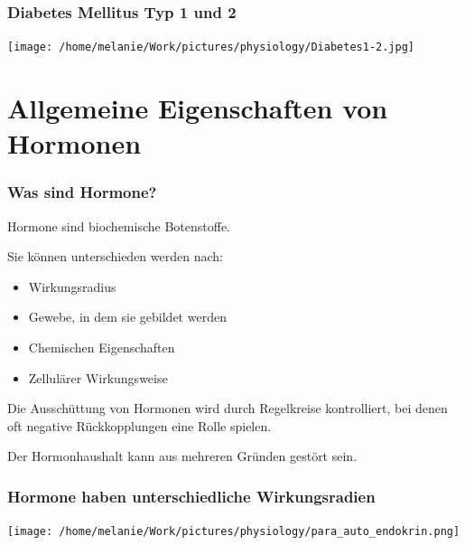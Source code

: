 \documentclass{beamer}
\begin{document}
\begin{frame}
\frametitle{Diabetes Mellitus Typ 1 und 2}

\begin{center}
\texttt{[image: /home/melanie/Work/pictures/physiology/Diabetes1-2.jpg]}
\end{center}


\end{frame}



\section{Allgemeine Eigenschaften von Hormonen}

\begin{frame}
\frametitle{Was sind Hormone?}

Hormone sind biochemische Botenstoffe. 

\pause

Sie können unterschieden werden nach:

\begin{itemize}
\item
Wirkungsradius
\item
Gewebe, in dem sie gebildet werden
\item
Chemischen Eigenschaften
\item
Zellulärer Wirkungsweise
\end{itemize}

\pause

Die Ausschüttung von Hormonen wird durch Regelkreise kontrolliert, bei denen oft negative Rückkopplungen eine Rolle spielen. \\

\pause

Der Hormonhaushalt kann aus mehreren Gründen gestört sein.

\end{frame}

\begin{frame}
\frametitle{Hormone haben unterschiedliche Wirkungsradien}

\begin{center}
\texttt{[image: /home/melanie/Work/pictures/physiology/para\_auto\_endokrin.png]}
\end{center}


\end{frame}
\end{document}
